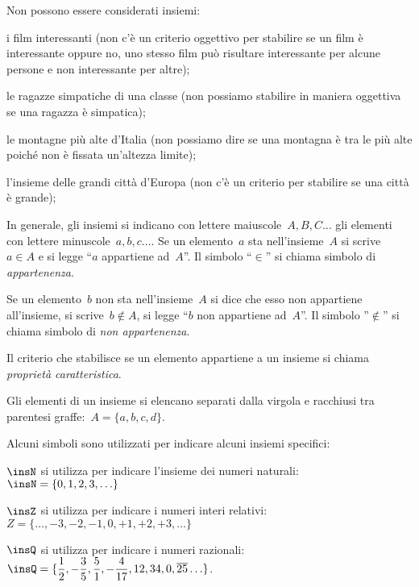 Non possono essere considerati insiemi:
\begin{itemize*}
 \item i film interessanti (non c'è un criterio oggettivo per stabilire se un 
 film è interessante oppure no, uno stesso film
 può risultare interessante per alcune persone e non interessante per altre);
 \item le ragazze simpatiche di una classe (non possiamo stabilire in maniera 
 oggettiva se una ragazza è simpatica);
 \item le montagne più alte d'Italia (non possiamo dire se una montagna è tra 
 le più alte poiché non è fissata un'altezza limite);
 \item l'insieme delle grandi città d'Europa (non c'è un criterio per
stabilire se una città è grande);
\end{itemize*}


In generale, gli insiemi si indicano con lettere maiuscole~$A, B, C\ldots$
gli elementi con lettere minuscole~$a, b, c\ldots$.
Se un elemento~$a$ sta nell'insieme~$A$ si scrive~$a\in A$ e si legge 
``$a$ appartiene ad~$A$''.
Il simbolo ``$\in$'' si chiama simbolo di \textit{appartenenza}.

Se un elemento~$b$ non sta nell'insieme~$A$ si dice
che esso non appartiene all'insieme, si scrive~$b\notin A$,
si legge ``$b$ non appartiene ad~$A$''. Il simbolo ''$\notin$''
si chiama simbolo di \textit{non appartenenza}.

Il criterio che stabilisce se un elemento appartiene a un insieme si chiama 
\textit{proprietà caratteristica}.

Gli elementi di un insieme si elencano separati dalla virgola e racchiusi tra 
parentesi graffe:~$A=\{a,b,c,d\}$.

Alcuni simboli sono utilizzati per indicare alcuni insiemi specifici:
\begin{itemize*}
 \item $\insN$ si utilizza per indicare l'insieme dei numeri 
  naturali:~$\insN=\{0,1,2,3,\ldots\}$
 \item $\insZ$ si utilizza per indicare i numeri interi 
  relativi:~$Z=\{\ldots,-3,-2,-1,0,+1,+2,+3,\ldots\}$
 \item $\insQ$ si utilizza per indicare i numeri 
 razionali:~$\insQ=\{\dfrac{1}{2},-\dfrac{3}{5},\dfrac{5}{1},-
             \dfrac{4}{17},12,34,0,\overline{{25}}\ldots\}$.
 \end{itemize*}

